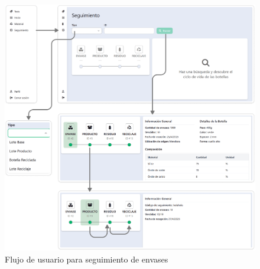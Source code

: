 \begin{figure}[!htb]
	\centering
	\includegraphics[width=\linewidth]{Figures/flow-tracking.png}
	\caption{Flujo de usuario para seguimiento de envases}
  \label{fig:flow-tracking}
\end{figure}
